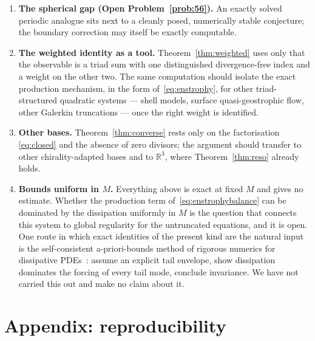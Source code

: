 \documentclass[11pt]{amsart}
\newcommand{\R}{\mathbb{R}}
\theoremstyle{plain}
\theoremstyle{definition}
\theoremstyle{remark}
\begin{document}
\begin{enumerate}[leftmargin=*]
\item \textbf{The spherical gap (Open Problem~\ref{prob:56}).} An exactly solved periodic analogue
  sits next to a cleanly posed, numerically stable conjecture; the boundary correction may itself
  be exactly computable.
\item \textbf{The weighted identity as a tool.} Theorem~\ref{thm:weighted} uses only that the
  observable is a triad sum with one distinguished divergence-free index and a weight on the
  other two. The same computation should isolate the exact production mechanism, in the form
  of~\eqref{eq:enstrophy}, for other triad-structured quadratic systems --- shell models, surface
  quasi-geostrophic flow, other Galerkin truncations --- once the right weight is identified.
\item \textbf{Other bases.} Theorem~\ref{thm:converse} rests only on the factorisation
  \eqref{eq:closed} and the absence of zero divisors; the argument should transfer to other
  chirality-adapted bases and to $\R^3$, where Theorem~\ref{thm:reso} already holds.
\item \textbf{Bounds uniform in $M$.} Everything above is exact at fixed $M$ and gives no
  estimate. Whether the production term of~\eqref{eq:enstrophybalance} can be dominated by the
  dissipation uniformly in $M$ is the question that connects this system to global regularity for
  the untruncated equations, and it is open. One route in which exact identities of the present
  kind are the natural input is the self-consistent a-priori-bounds method of rigorous numerics
  for dissipative PDEs~\cite{zgliczynski2001}: assume an explicit tail envelope, show dissipation
  dominates the forcing of every tail mode, conclude invariance. We have not carried this out and
  make no claim about it.
\end{enumerate}

\appendix
\section*{Appendix: reproducibility}
\end{document}
